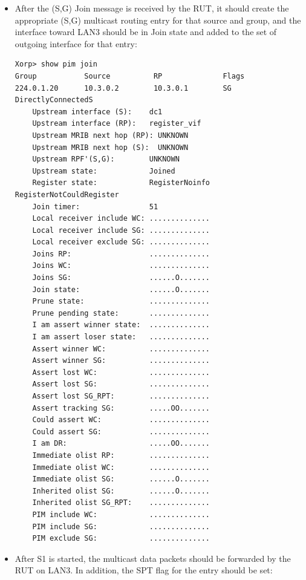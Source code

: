 \documentclass[11pt]{report}
\begin{document}
\begin{itemize}

  \item After the (S,G) Join message is received by the RUT, it
  should create the appropriate (S,G) multicast routing entry for
  that source and group, and the interface toward LAN3 should be in Join state
  and added to the set of outgoing interface for that entry:

\begin{verbatim}
Xorp> show pim join 
Group           Source          RP              Flags
224.0.1.20      10.3.0.2        10.3.0.1        SG DirectlyConnectedS 
    Upstream interface (S):    dc1
    Upstream interface (RP):   register_vif
    Upstream MRIB next hop (RP): UNKNOWN
    Upstream MRIB next hop (S):  UNKNOWN
    Upstream RPF'(S,G):        UNKNOWN
    Upstream state:            Joined 
    Register state:            RegisterNoinfo RegisterNotCouldRegister 
    Join timer:                51
    Local receiver include WC: ..............
    Local receiver include SG: ..............
    Local receiver exclude SG: ..............
    Joins RP:                  ..............
    Joins WC:                  ..............
    Joins SG:                  ......O.......
    Join state:                ......O.......
    Prune state:               ..............
    Prune pending state:       ..............
    I am assert winner state:  ..............
    I am assert loser state:   ..............
    Assert winner WC:          ..............
    Assert winner SG:          ..............
    Assert lost WC:            ..............
    Assert lost SG:            ..............
    Assert lost SG_RPT:        ..............
    Assert tracking SG:        .....OO.......
    Could assert WC:           ..............
    Could assert SG:           ..............
    I am DR:                   .....OO.......
    Immediate olist RP:        ..............
    Immediate olist WC:        ..............
    Immediate olist SG:        ......O.......
    Inherited olist SG:        ......O.......
    Inherited olist SG_RPT:    ..............
    PIM include WC:            ..............
    PIM include SG:            ..............
    PIM exclude SG:            ..............
\end{verbatim}

  \item After S1 is started, the multicast data packets should be
  forwarded by the RUT on LAN3. In addition, the SPT flag for the
  entry should be set:


\end{itemize}
\end{document}
